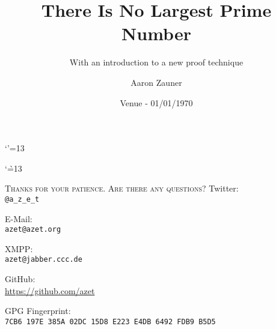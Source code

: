 \documentclass[hyperref={draft}, aspectratio=169, compress, 10pt]{beamer}
\title{There Is No Largest Prime Number}
\subtitle{With an introduction to a new proof technique}
\author[Aaron Zauner]{Aaron Zauner}
\date{Venue - 01/01/1970}
\begin{document}
\makeatletter
\let \@sverbatim \@verbatim
\def \@verbatim {\@sverbatim \verbatimplus}
{\catcode`'=13 \gdef \verbatimplus{\catcode`'=13 \chardef '=13 }} 
\makeatother

\makeatletter
{\catcode`\`=13
\xdef\@verbatim{\unexpanded\expandafter{\@verbatim}\chardef\noexpand`=18 }
}
\makeatother

{

\begin{frame}
  \titlepage
\end{frame}

}
\addtocounter{framenumber}{-1}

{

\begin{frame}
  \tableofcontents
\end{frame}

}
\addtocounter{framenumber}{-1}




\begin{frame}
  \begin{center}
    \textsc{Thanks for your patience. Are there any questions?}
    \vfill
    Twitter:\\
    \texttt{@a\_z\_e\_t}

    \vfill
    E-Mail:\\
    \texttt{azet@azet.org}

    \vfill
    XMPP:\\
    \texttt{azet@jabber.ccc.de}

    \vfill
    GitHub:\\
    \url{https://github.com/azet}

    \vfill
    GPG Fingerprint:\\
    \texttt{7CB6 197E 385A 02DC 15D8 E223 E4DB 6492 FDB9 B5D5}
  \end{center}
\end{frame}


\end{document}
